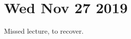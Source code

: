 \documentclass[main.tex]{subfiles}
\begin{document}
\section*{Wed Nov 27 2019}

Missed lecture, to recover. 
\end{document}
